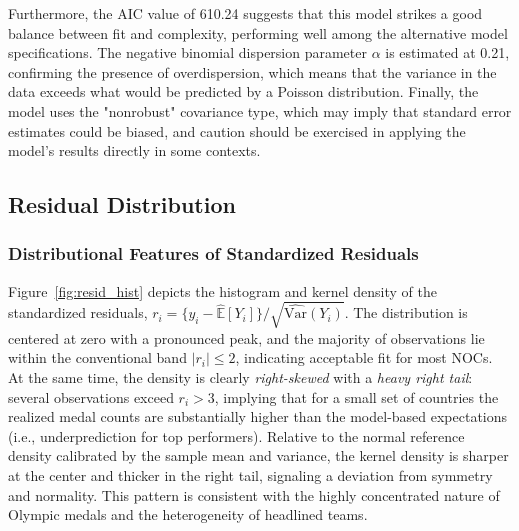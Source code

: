 \documentclass[11pt,twoside]{article}
\numberwithin{Theorem}{section}
\numberwithin{Definition}{section}
\numberwithin{Lemma}{section}
\numberwithin{Algorithm}{section}
\numberwithin{equation}{section}
\begin{document}
Furthermore, the AIC value of 610.24 suggests that this model strikes a good balance between fit and complexity, performing well among the alternative model specifications. The negative binomial dispersion parameter $\alpha$ is estimated at 0.21, confirming the presence of overdispersion, which means that the variance in the data exceeds what would be predicted by a Poisson distribution. Finally, the model uses the "nonrobust" covariance type, which may imply that standard error estimates could be biased, and caution should be exercised in applying the model's results directly in some contexts.


\subsection{Residual Distribution}
\subsubsection{Distributional Features of Standardized Residuals}

Figure~\ref{fig:resid_hist} depicts the histogram and kernel density of the standardized
residuals, $r_i=\{y_i-\widehat{\mathbb{E}}[Y_i]\}/\sqrt{\widehat{\mathrm{Var}}(Y_i)}$.
The distribution is centered at zero with a pronounced peak, and the majority of
observations lie within the conventional band $|r_i|\leq2$, indicating acceptable fit
for most NOCs. At the same time, the density is clearly \emph{right-skewed} with a
\emph{heavy right tail}: several observations exceed $r_i>3$, implying that for a small
set of countries the realized medal counts are substantially higher than the model-based
expectations (i.e., underprediction for top performers). Relative to the normal reference
density calibrated by the sample mean and variance, the kernel density is sharper at the
center and thicker in the right tail, signaling a deviation from symmetry and normality.
This pattern is consistent with the highly concentrated nature of Olympic medals and the
heterogeneity of headlined teams.
\end{document}
